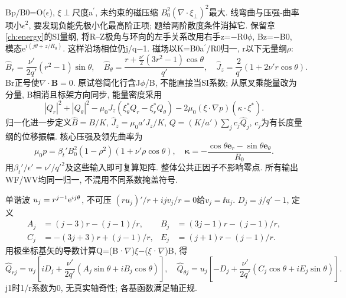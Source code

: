 \begin{solution}
Bp/B0=O(\ensuremath{\epsilon}), \ensuremath{\xi}\ensuremath{\perp}尺度a\ensuremath{{}^{\prime}}, 未约束的磁压缩 $B_0^2(\nabla\cdot\xi_\perp)^2$最大. 线弯曲与压强-曲率项小\ensuremath{\epsilon}\ensuremath{{}^{2}}, 要发现负能先极小化最高阶正项; 题给两阶散度条件消掉它. 保留章\ref{ch:energy}的SI量纲, 将R--Z极角与环向的左手关系改用右手z=\ensuremath{-}R0\ensuremath{\phi}, Bz=\ensuremath{-}B0, 模态e$^{i(j\ensuremath{\theta}+z/R_0)}$. 这样沿场相位仍j/q\ensuremath{-}1. 磁场以K=B0a\ensuremath{{}^{\prime}}/R0归一, r以下无量纲\ensuremath{\rho}:
\begin{equation}
 \widehat B_r=\frac{\nu'}{2q'}(r^2-1)\sin\theta,\quad
 \widehat B_\theta=\frac{r+\tfrac{\nu'}2(3r^2-1)\cos\theta}{q'},\quad
 \widehat J_z=\frac2{q'}(1+2\nu'r\cos\theta).
\end{equation}
Br正号使$\nabla\cdot\mathbf B=0$. 原试卷简化行含J\ensuremath{\phi}/B, 不能直接当SI系数; 从原叉乘能量改为分量, B相消且标架方向同步, 能量密度采用
\begin{equation}
 |Q_r|^2+|Q_\theta|^2-\mu_0J_z(\xi_\theta^*Q_r-\xi_r^*Q_\theta)
 -2\mu_0(\xi\cdot\nabla p)(\kappa\cdot\xi^*).
\end{equation}
归一化进一步定义$\widehat B=B/K$, $\widehat J_z=\mu_0a'J_z/K$, $Q=(K/a')\sum_jc_j\widehat Q_j$, $c_j$为有长度量纲的位移振幅. 核心压强及领先曲率为
\begin{equation}
 \mu_0p=\beta_t'B_0^2(1-\rho^2)(1+\nu'\rho\cos\theta),\quad
 \boldsymbol\kappa=-\frac{\cos\theta\mathbf e_r-\sin\theta\mathbf e_\theta}{R_0}.
\end{equation}
用$\beta_t'/\epsilon'=\nu'/q'^2$及这些输入即可复算矩阵. 整体公共正因子不影响零点. 所有输出WF/WV均同一归一, 不混用不同系数掩盖符号.

单谐波 $u_j=r^{j-1}\mathrm e^{ij\theta}$, 不可压 $(ru_j)'/r+ijv_j/r=0$给$v_j=\ii u_j$. $D_j=j/q'-1$, 定义
\begin{align}
 A_j&=(j-3)r-(j-1)/r,& B_j&=(3j-1)r-(j-1)/r,\\
 C_j&=-(3j+3)r+(j-1)/r,& E_j&=(j+1)r-(j-1)/r.
\end{align}
用极坐标基矢的导数计算Q=(B·\ensuremath{\nabla})\ensuremath{\xi}\ensuremath{-}(\ensuremath{\xi}·\ensuremath{\nabla})B, 得
\begin{equation}
 \widehat Q_{rj}=u_j\left[iD_j+\frac{\nu'}{2q'}(A_j\sin\theta+iB_j\cos\theta)\right],\quad
 \widehat Q_{\theta j}=u_j\left[-D_j+\frac{\nu'}{2q'}(C_j\cos\theta+iE_j\sin\theta)\right].
\end{equation}
j1时1/r系数为0, 无真实轴奇性; 各基函数满足轴正规.


\end{solution}
